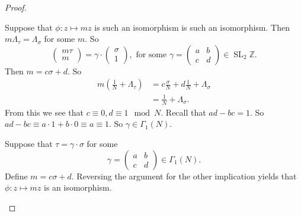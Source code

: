 \documentclass[a4paper]{article}
\theoremstyle{theoremdd}
\theoremstyle{definitiondd}
\theoremstyle{remarkdd}
\newcommand{\Z}{\mathbb{Z}}
\newcommand{\ltr}{\par \noindent \framebox[1\width]{ $\implies$ } \hspace{.2cm}}
\newcommand{\rtl}{\par \noindent \framebox[1\width]{ $\impliedby$ } \hspace{.2cm} }
\DeclareMathOperator{\SL}{SL}
\begin{document}
\begin{proof}
\begin{enumerate}
	\ltr Suppose that $\phi: z\mapsto  m z$ is such an isomorphism is such an isomorphism.
	Then $m \Lambda_\tau = \Lambda_\sigma$ for some $m$. So \[
	\begin{pmatrix} m \tau \\ m \end{pmatrix} = 
	\gamma \cdot  \begin{pmatrix} \sigma \\ 1 \end{pmatrix} , 
	\text{ for some } \gamma = \begin{pmatrix} a & b \\ c & d \end{pmatrix} \in \SL_2 \Z
	.\] 
	Then $m = c \sigma + d$. So 
	 \begin{align*}
		 m \left( \frac{1}{N} + \Lambda_\tau \right)  &= c \frac{\sigma}{N} + d \frac{1}{N} + \Lambda_\sigma \\
		 &=  \frac{1}{N} + \Lambda_\sigma
	.\end{align*}
	From this we see that $c \equiv 0, d \equiv 1 \mod N$. Recall that  $ad - bc = 1$. 
	So  $ad - bc \equiv a\cdot 1 + b\cdot 0 \equiv a \equiv 1$. So $\gamma \in \Gamma_1(N)$.
	\rtl Suppose that $\tau = \gamma \cdot \sigma$ for some \[
		\gamma = \begin{pmatrix} a & b \\ c & d  \end{pmatrix} \in \Gamma_1(N)
	.\] 	
	Define $m = c \sigma + d$. Reversing the argument for the other implication yields that $\phi:z \mapsto m z$ is an isomorphism.		


\end{enumerate}
\end{proof}
\end{document}
